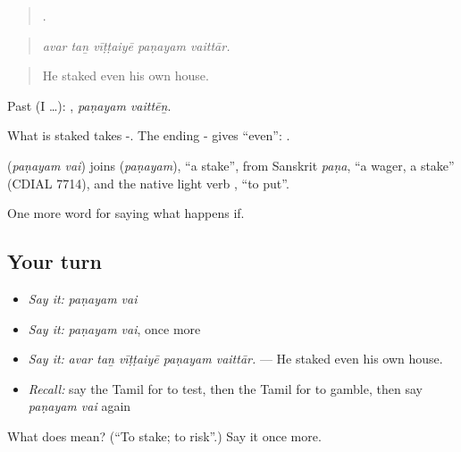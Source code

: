 \begin{quote}
    .
\end{quote}

\begin{quote}
\emph{avar taṉ vīṭṭaiyē paṇayam vaittār.}
\end{quote}

\begin{quote}
He staked even his own house.
\end{quote}

Past (I …):  , \emph{paṇayam vaittēṉ}.

What is staked takes -. The ending - gives \textquotedblleft{}even\textquotedblright{}: .

\begin{cousinweb}
\textbf{ } (\emph{paṇayam vai}) joins  (\emph{paṇayam}), \textquotedblleft{}a stake\textquotedblright{}, from Sanskrit \emph{paṇa}, \textquotedblleft{}a wager, a stake\textquotedblright{} (CDIAL 7714), and the native light verb , \textquotedblleft{}to put\textquotedblright{}.
\end{cousinweb}

\begin{grammarlens}[title={What you've built}]
One more word for saying what happens if.
\end{grammarlens}

\subsection*{Your turn}
\begin{itemize}
\raggedright
  \item \emph{Say it:} \emph{paṇayam vai}
  \item \emph{Say it:} \emph{paṇayam vai}, once more
  \item \emph{Say it:} \emph{avar taṉ vīṭṭaiyē paṇayam vaittār.} — He staked even his own house.
  \item \emph{Recall:} say the Tamil for to test, then the Tamil for to gamble, then say \emph{paṇayam vai} again
\end{itemize}

\begin{tcolorbox}[breakable,colback=teal!4,colframe=teal!35!black,title={Before you move on}]
What does   mean? (\textquotedblleft{}To stake; to risk\textquotedblright{}.) Say it once more.
\end{tcolorbox}
